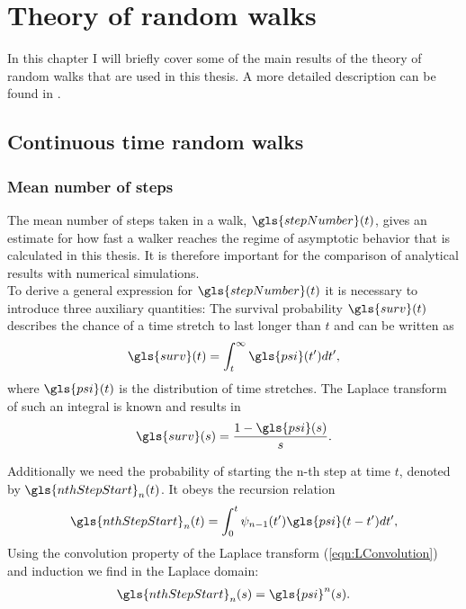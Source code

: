 \section{Theory of random walks}

In this chapter I will briefly cover some of the main results of the theory of random walks that are used in this thesis. A more detailed description can be found in \cite{firstSteps}.


\subsection{Continuous time random walks}

\subsubsection{Mean number of steps}

The mean number of steps taken in a walk, $\gls{stepNumber}(t)$, gives an estimate for how fast a walker reaches the regime of asymptotic behavior that is calculated in this thesis. It is therefore important for the comparison of analytical results with numerical simulations.\\
To derive a general expression for $\gls{stepNumber}(t)$ it is necessary to introduce three auxiliary quantities: The survival probability $\gls{surv}(t)$ describes the chance of a time stretch to last longer than $t$ and can be written as
%
\begin{align}
\gls{surv}(t) = \int_{t}^{\infty} \gls{psi}(t') dt' ,
\end{align}
%
where $\gls{psi}(t)$ is the distribution of time stretches. The Laplace transform of such an integral is known and results in 
%
\begin{align}
\gls{surv}(s) = \frac{1-\gls{psi}(s)}{s} \label{eqn:surv}.
\end{align}

Additionally we need the probability of starting the n-th step at time $t$, denoted by $\gls{nthStepStart}_{n}(t)$. It obeys the recursion relation
%
\begin{align}
\gls{nthStepStart}_{n}(t) = \int_{0}^{t} \psi_{n-1}(t') \gls{psi}(t-t') dt' ,
\end{align}
%
Using the convolution property of the Laplace transform (\ref{eqn:LConvolution}) and induction we find in the Laplace domain:
%
\begin{align}
\gls{nthStepStart}_n(s) = \gls{psi}^{n}(s) \label{eqn:nthStepStart}.
\end{align}

